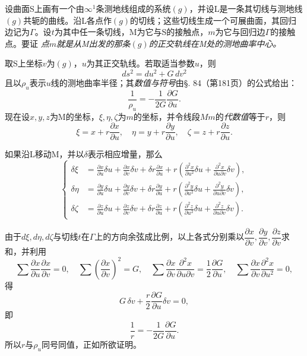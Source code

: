设曲面S上画有一个由\(\infty^1\)条测地线组成的系统\((g)\)，并设L是一条其切线与测地线\((g)\)共轭的曲线。沿L各点作\((g)\)的切线；这些切线生成一个可展曲面，其回归边记为\(\Gamma\)。设\(t\)为其中任一条切线，M为它与S的接触点，\(m\)为它与回归边\(\Gamma\)的接触点。要证
\emph{点\(m\)就是从M出发的那条\((g)\)的正交轨线在M处的测地曲率中心。}

取S上坐标\(v\)为\((g)\)，\(u\)为其正交轨线。若取适当参数\(u\)，则
\[
 ds^2=du^2+G\,dv^2
\]
且以\(\rho_u\)表示\(u\)线的测地曲率半径；其\emph{数值与符号}由\S. 84（第181页）的公式给出：
\[
 \frac1{\rho_u}=-\frac1{2G}\frac{\partial G}{\partial u}.
\]
现在设\(x,y,z\)为M的坐标，\(\xi,\eta,\zeta\)为\(m\)的坐标，并令线段\(Mm\)的\emph{代数值}等于\(r\)，则
\[
 \xi=x+r\frac{\partial x}{\partial u},
 \quad
 \eta=y+r\frac{\partial y}{\partial u},
 \quad
 \zeta=z+r\frac{\partial z}{\partial u}.
\]

如果沿L移动M，并以\(\delta\)表示相应增量，那么
\[
\left\{
\begin{aligned}
\delta\xi&=\frac{\partial x}{\partial u}\delta u+\frac{\partial x}{\partial v}\delta v+\delta r\frac{\partial x}{\partial u}+r\left(\frac{\partial^2x}{\partial u^2}\delta u+\frac{\partial^2x}{\partial u\partial v}\delta v\right),\\
\delta\eta&=\frac{\partial y}{\partial u}\delta u+\frac{\partial y}{\partial v}\delta v+\delta r\frac{\partial y}{\partial u}+r\left(\frac{\partial^2y}{\partial u^2}\delta u+\frac{\partial^2y}{\partial u\partial v}\delta v\right),\\
\delta\zeta&=\frac{\partial z}{\partial u}\delta u+\frac{\partial z}{\partial v}\delta v+\delta r\frac{\partial z}{\partial u}+r\left(\frac{\partial^2z}{\partial u^2}\delta u+\frac{\partial^2z}{\partial u\partial v}\delta v\right).
\end{aligned}
\right.
\]

由于\(d\xi,d\eta,d\zeta\)与切线\(t\)在\(\Gamma\)上的方向余弦成比例，以上各式分别乘以\(\dfrac{\partial x}{\partial v},\dfrac{\partial y}{\partial v},\dfrac{\partial z}{\partial v}\)求和，并利用
\[
\sum\frac{\partial x}{\partial u}\frac{\partial x}{\partial v}=0,
\quad
\sum\left(\frac{\partial x}{\partial v}\right)^2=G,
\quad
\sum\frac{\partial x}{\partial v}\frac{\partial^2x}{\partial u\partial v}=\frac12\frac{\partial G}{\partial u},
\quad
\sum\frac{\partial x}{\partial v}\frac{\partial^2x}{\partial u^2}=0,
\]
得
\[
 G\,\delta v+\frac r2\frac{\partial G}{\partial u}\delta v=0,
\]
即
\[
 \frac1r=-\frac1{2G}\frac{\partial G}{\partial u}.
\]
所以\(r\)与\(\rho_u\)同号同值，正如所欲证明。

